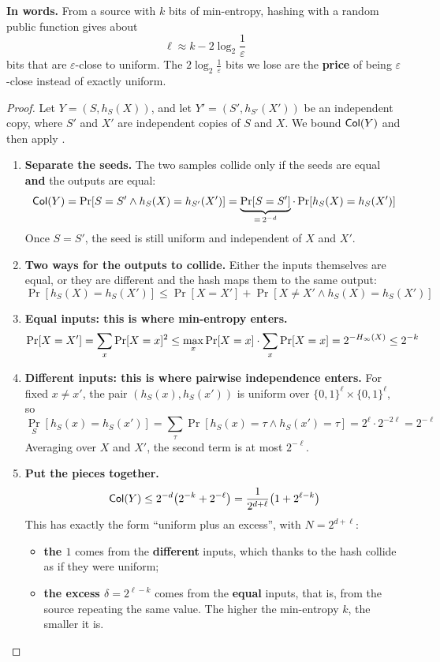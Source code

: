 \textbf{In words.} From a source with $k$ bits of min-entropy, hashing with a random public function gives about
\[
  \ell \approx k - 2\log_2\frac{1}{\varepsilon}
\]
bits that are $\varepsilon$-close to uniform. The $2\log_2\frac{1}{\varepsilon}$ bits we lose are the \textbf{price} of being $\varepsilon$-close instead of exactly uniform.

\begin{proof}
  Let $Y = (S, h_S(X))$, and let $Y' = (S', h_{S'}(X'))$ be an independent copy, where $S'$ and $X'$ are independent copies of $S$ and $X$. We bound $\mathsf{Col}(Y)$ and then apply .
  \begin{enumerate}
    \item \textbf{Separate the seeds.} The two samples collide only if the seeds are equal \textbf{and} the outputs are equal:
    \[
      \mathsf{Col}(Y) = \Pr[S = S' \wedge h_S(X) = h_{S'}(X')] = \underbrace{\Pr[S = S']}_{=\,2^{-d}} \cdot \Pr[h_S(X) = h_S(X')]
    \]
    Once $S = S'$, the seed is still uniform and independent of $X$ and $X'$.
    \item \textbf{Two ways for the outputs to collide.} Either the inputs themselves are equal, or they are different and the hash maps them to the same output:
    \[
      \Pr[h_S(X) = h_S(X')] \leq \Pr[X = X'] + \Pr[X \neq X' \wedge h_S(X) = h_S(X')]
    \]
    \item \textbf{Equal inputs: this is where min-entropy enters.}
    \[
      \Pr[X = X'] = \sum_x \Pr[X = x]^2 \leq \max_x \Pr[X = x] \cdot \sum_x \Pr[X = x] = 2^{-H_\infty(X)} \leq 2^{-k}
    \]
    \item \textbf{Different inputs: this is where pairwise independence enters.} For fixed $x \neq x'$, the pair $(h_S(x), h_S(x'))$ is uniform over $\{0,1\}^\ell \times \{0,1\}^\ell$, so
    \[
      \Pr_S[h_S(x) = h_S(x')] = \sum_{\tau} \Pr[h_S(x) = \tau \wedge h_S(x') = \tau] = 2^\ell \cdot 2^{-2\ell} = 2^{-\ell}
    \]
    Averaging over $X$ and $X'$, the second term is at most $2^{-\ell}$.
    \item \textbf{Put the pieces together.}
    \[
      \mathsf{Col}(Y) \leq 2^{-d}\big(2^{-k} + 2^{-\ell}\big) = \frac{1}{2^{d+\ell}}\big(1 + 2^{\ell - k}\big)
    \]
    This has exactly the form ``uniform plus an excess'', with $N = 2^{d+\ell}$:
    \begin{itemize}
      \item \textbf{the $1$} comes from the \textbf{different} inputs, which thanks to the hash collide as if they were uniform;
      \item \textbf{the excess $\delta = 2^{\ell - k}$} comes from the \textbf{equal} inputs, that is, from the source repeating the same value. The higher the min-entropy $k$, the smaller it is.

\end{itemize}
\end{enumerate}
\end{proof}
